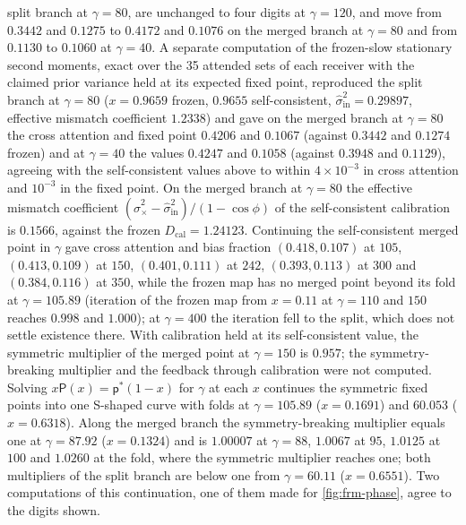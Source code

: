 \begin{numcheck}
split branch at $\gamma=80$, are unchanged to four digits at $\gamma=120$, and move from $0.3442$ and $0.1275$ to $0.4172$ and $0.1076$ on the merged branch at $\gamma=80$ and from $0.1130$ to $0.1060$ at $\gamma=40$. A separate computation of the frozen-slow stationary second moments, exact over the 35 attended sets of each receiver with the claimed prior variance held at its expected fixed point, reproduced the split branch at $\gamma=80$ ($x=0.9659$ frozen, $0.9655$ self-consistent, $\hat\sigma^2_{\mathrm{in}}=0.29897$, effective mismatch coefficient $1.2338$) and gave on the merged branch at $\gamma=80$ the cross attention and fixed point $0.4206$ and $0.1067$ (against $0.3442$ and $0.1274$ frozen) and at $\gamma=40$ the values $0.4247$ and $0.1058$ (against $0.3948$ and $0.1129$), agreeing with the self-consistent values above to within $4\times10^{-3}$ in cross attention and $10^{-3}$ in the fixed point. On the merged branch at $\gamma=80$ the effective mismatch coefficient $(\hat\sigma^2_\times-\hat\sigma^2_{\mathrm{in}})/(1-\cos\phi)$ of the self-consistent calibration is $0.1566$, against the frozen $D_{\mathrm{cal}}=1.24123$. Continuing the self-consistent merged point in $\gamma$ gave cross attention and bias fraction $(0.418,0.107)$ at $105$, $(0.413,0.109)$ at $150$, $(0.401,0.111)$ at $242$, $(0.393,0.113)$ at $300$ and $(0.384,0.116)$ at $350$, while the frozen map has no merged point beyond its fold at $\gamma=105.89$ (iteration of the frozen map from $x=0.11$ at $\gamma=110$ and $150$ reaches $0.998$ and $1.000$); at $\gamma=400$ the iteration fell to the split, which does not settle existence there. With calibration held at its self-consistent value, the symmetric multiplier of the merged point at $\gamma=150$ is $0.957$; the symmetry-breaking multiplier and the feedback through calibration were not computed. Solving $x\mathsf P(x)=\mathsf p^\ast(1-x)$ for $\gamma$ at each $x$ continues the symmetric fixed points into one S-shaped curve with folds at $\gamma=105.89$ ($x=0.1691$) and $60.053$ ($x=0.6318$). Along the merged branch the symmetry-breaking multiplier equals one at $\gamma=87.92$ ($x=0.1324$) and is $1.00007$ at $\gamma=88$, $1.0067$ at $95$, $1.0125$ at $100$ and $1.0260$ at the fold, where the symmetric multiplier reaches one; both multipliers of the split branch are below one from $\gamma=60.11$ ($x=0.6551$). Two computations of this continuation, one of them made for \cref{fig:frm-phase}, agree to the digits shown.
\end{numcheck}

